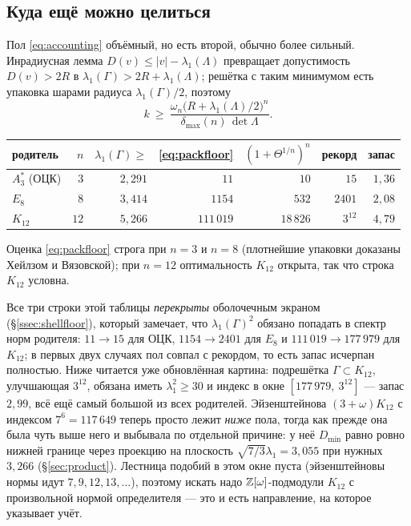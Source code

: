 \subsection{Куда ещё можно целиться}
\label{ssec:window}

Пол \eqref{eq:accounting} объёмный, но есть второй, обычно более сильный.
Инрадиусная лемма $D(v)\le|v|-\lambda_1(\Lambda)$ превращает допустимость
$D(v)>2R$ в $\lambda_1(\Gamma)>2R+\lambda_1(\Lambda)$; решётка с таким минимумом
есть упаковка шарами радиуса $\lambda_1(\Gamma)/2$, поэтому
\begin{equation}\label{eq:packfloor}
k\ \ge\ \frac{\omega_n\bigl(R+\lambda_1(\Lambda)/2\bigr)^{n}}
             {\delta_{\max}(n)\,\det\Lambda}.
\end{equation}

\begin{center}
\begin{tabular}{@{}lrrrrrr@{}}
\toprule
родитель & $n$ & $\lambda_1(\Gamma)\ge$ & \eqref{eq:packfloor} &
$(1+\Theta^{1/n})^n$ & рекорд & запас\\
\midrule
$A_3^*$ (ОЦК) & $3$  & $2{,}291$ & $11$      & $10$      & $15$      & $1{,}36$\\
$E_8$         & $8$  & $3{,}414$ & $1154$    & $532$     & $2401$    & $2{,}08$\\
$K_{12}$      & $12$ & $5{,}266$ & $111\,019$& $18\,826$ & $3^{12}$  & $4{,}79$\\
\bottomrule
\end{tabular}
\end{center}

Оценка \eqref{eq:packfloor} строга при $n=3$ и $n=8$ (плотнейшие упаковки
доказаны Хейлзом и Вязовской); при $n=12$ оптимальность $K_{12}$ открыта, так
что строка $K_{12}$ условна.

Все три строки этой таблицы \emph{перекрыты} оболочечным экраном
(\S\ref{ssec:shellfloor}), который замечает, что $\lambda_1(\Gamma)^2$ обязано
попадать в спектр норм родителя: $11\to15$ для ОЦК, $1154\to2401$ для $E_8$ и
$111\,019\to177\,979$ для $K_{12}$; в первых двух случаях пол совпал с
рекордом, то есть запас исчерпан полностью. Ниже читается уже обновлённая
картина: подрешётка $\Gamma\subset K_{12}$, улучшающая $3^{12}$, обязана иметь
$\lambda_1^2\ge30$ и индекс в окне $[177\,979,\ 3^{12}]$ --- запас $2{,}99$,
всё ещё самый большой из всех родителей. Эйзенштейнова $(3+\omega)K_{12}$ с
индексом $7^6=117\,649$ теперь просто лежит \emph{ниже} пола, тогда как прежде
она была чуть выше него и выбывала по отдельной причине: у неё $D_{\min}$ равно
ровно нижней границе через проекцию на плоскость $\sqrt{7/3}\lambda_1=3{,}055$ при нужных $3{,}266$
(\S\ref{sec:product}). Лестница подобий в этом окне пуста (эйзенштейновы нормы
идут $7,9,12,13,\dots$), поэтому искать надо $\mathbb{Z}[\omega]$-подмодули $K_{12}$ с
произвольной нормой определителя --- это и есть направление, на которое
указывает учёт.

